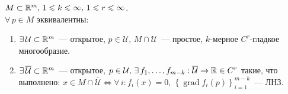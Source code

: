 \begin{Theorem*}
    $M\subset \mathbb{R}^{m},\,1\leqslant k\leqslant \infty,\,1\leqslant r\leqslant \infty$.\\
    \THEN $\forall\,p\in M$ эквивалентны:
    \newcommand{\UU}{\mathcal{U}}
    \newcommand{\UUp}{\overline{\mathcal{U}}}
    \begin{enumerate}
        \item $\exists\,\UU\subset\rmy$~--- открытое, $p\in\UU,\,M\cap\UU$~--- простое, $k$-мерное $C^r$-гладкое многообразие.
        \item $\exists\,\UUp\subset\rmy$~--- открытое, $p\in\UU,\,\exists\,f_1,\ldots,f_{m-k}:\UUp\to\rmy[{}]\in C^r$ такие, что выполнено:
        $x\in M\cap\UUp\Leftrightarrow\forall\,i: f_i(x)=0,\,\left\{\operatorname{grad} f_i(p)\right\}_{i=1}^{m-k}$~--- ЛНЗ.
    \end{enumerate}
\end{Theorem*}
